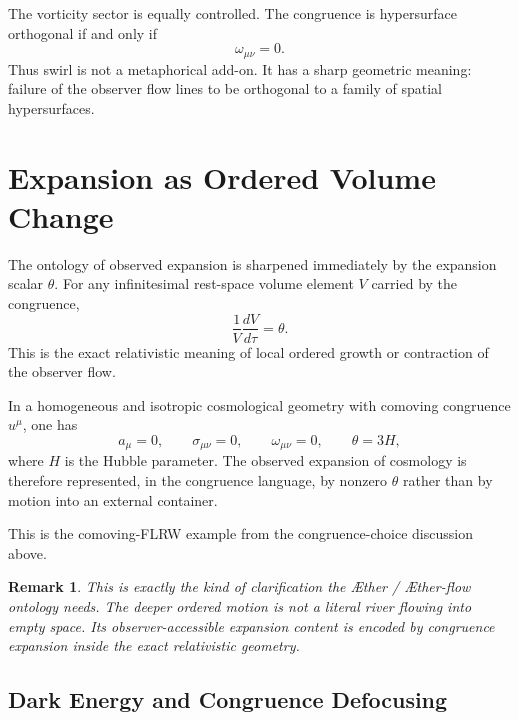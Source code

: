 \documentclass[11pt]{article}
\newcommand{\Aether}{\AE{}ther}
\newcommand{\Aflow}{\AE{}ther-flow}
\newtheorem{remark}{Remark}
\begin{document}
The vorticity sector is equally controlled. The congruence is hypersurface orthogonal if and only if
\begin{equation}
\omega_{\mu\nu}=0.
\label{eq:frobenius}
\end{equation}
Thus swirl is not a metaphorical add-on. It has a sharp geometric meaning: failure of the observer flow lines to be orthogonal to a family of spatial hypersurfaces.

\section{Expansion as Ordered Volume Change}

The ontology of observed expansion is sharpened immediately by the expansion scalar \(\theta\). For any infinitesimal rest-space volume element \(V\) carried by the congruence,
\begin{equation}
\frac{1}{V}\frac{dV}{d\tau}=\theta.
\label{eq:volumeexpansion}
\end{equation}
This is the exact relativistic meaning of local ordered growth or contraction of the observer flow.

In a homogeneous and isotropic cosmological geometry with comoving congruence \(u^\mu\), one has
\begin{equation}
a_\mu=0,
\qquad
\sigma_{\mu\nu}=0,
\qquad
\omega_{\mu\nu}=0,
\qquad
\theta = 3H,
\label{eq:flrwtheta}
\end{equation}
where \(H\) is the Hubble parameter. The observed expansion of cosmology is therefore represented, in the congruence language, by nonzero \(\theta\) rather than by motion into an external container.

This is the comoving-FLRW example from the congruence-choice discussion above.

\begin{remark}
This is exactly the kind of clarification the \Aether{} / \Aflow{} ontology needs. The deeper ordered motion is not a literal river flowing into empty space. Its observer-accessible expansion content is encoded by congruence expansion inside the exact relativistic geometry.
\end{remark}

\subsection{Dark Energy and Congruence Defocusing}
\end{document}
